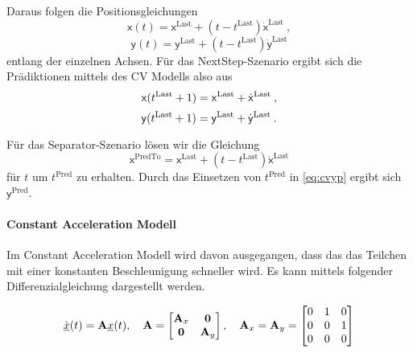 Daraus folgen die Positionsgleichungen 
\begin{equation*}
    \mathsf{x}(t) = \mathsf{x}^{\text{Last}} + (t - t^{\text{Last}})\dot{\mathsf{x}}^{\text{Last}} \: ,
\end{equation*}
\begin{equation*}
    \mathsf{y}(t) = \mathsf{y}^{\text{Last}} + (t - t^{\text{Last}})\dot{\mathsf{y}}^{\text{Last}}
\end{equation*}
% 
entlang der einzelnen Achsen.
Für das NextStep-Szenario ergibt sich die Prädiktionen mittels des CV Modells also aus
\begin{equation*}
    \mathsf{x}(t{^{\text{Last}}}+1) = \mathsf{x}^{\text{Last}} + \dot{\mathsf{x}}^{\text{Last}} \: ,
\end{equation*}
\begin{equation}\label{eq:cvyp}
    \mathsf{y}(t{^{\text{Last}}}+1) = \mathsf{y}^{\text{Last}} + \dot{\mathsf{y}}^{\text{Last}} \: .
\end{equation}

Für das Separator-Szenario lösen wir die Gleichung 
% 
\begin{equation*}
    \mathsf{x}^{\text{PredTo}} = \mathsf{x}^{\text{Last}} + (t - t^{\text{Last}})\dot{\mathsf{x}}^{\text{Last}}
\end{equation*}
% 
für \(t\) um  \(t^{\text{Pred}}\) zu erhalten.
Durch das Einsetzen von \(t^{\text{Pred}}\) in \eqref{eq:cvyp} ergibt sich \(\mathsf{y}^{\text{Pred}}\).

\paragraph{Constant Acceleration Modell}

Im Constant Acceleration Modell wird davon ausgegangen, dass das das Teilchen mit einer konstanten Beschleunigung schneller wird.
Es kann mittels folgender Differenzialgleichung dargestellt werden.

\begin{align*} \label{eq:speedCV}
    \dot{{\underline{x}}}(t) = {{\mathbf{A}}}{\underline{x}}(t), \quad {\ensuremath{{\mathbf{A}}}} = 
    \begin{bmatrix}
        {\ensuremath{{\mathbf{A}}}}_x & \boldsymbol{0} \\
        \boldsymbol{0} & {{\mathbf{A}}}_y
    \end{bmatrix} 
    , \quad
    {\ensuremath{{\mathbf{A}}}}_x = {{\mathbf{A}}}_y = 
    \begin{bmatrix}
        0 & 1 & 0 \\
        0 & 0 & 1 \\
        0 & 0 & 0
    \end{bmatrix} 
\end{align*}

